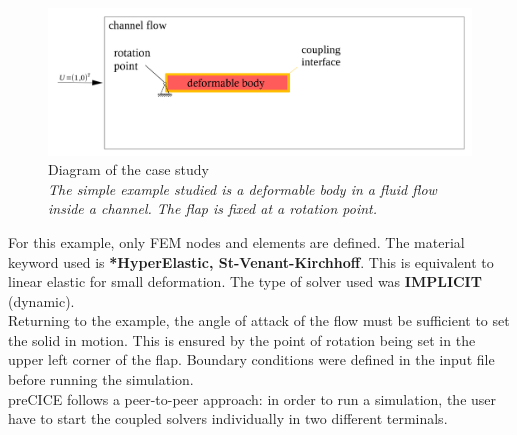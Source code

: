 \documentclass[oneside,11pt,times]{book}
\begin{document}
\begin{figure}[h]
    \centering
    \includegraphics[width=15cm]{imgs/Illustrations/example.png}
    \caption{Diagram of the case study\\ \emph{The simple example studied is a deformable body in a fluid flow inside a channel. The flap is fixed at a rotation point.}}
    \label{}
\end{figure}

For this example, only FEM nodes and elements are defined. The material keyword used is \textbf{*HyperElastic, St-Venant-Kirchhoff}. This is equivalent to linear elastic for small deformation. The type of solver used was \textbf{IMPLICIT} (dynamic).\\

Returning to the example, the angle of attack of the flow must be sufficient to set the solid in motion. This is ensured by the point of rotation being set in the upper left corner of the flap. Boundary conditions were defined in the input file before running the simulation.\\

preCICE follows a peer-to-peer approach: in order to run a simulation, the user have to start the coupled solvers individually in two different terminals.
\end{document}

